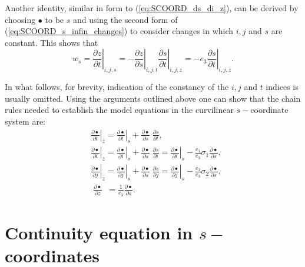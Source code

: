 \documentclass[../main/NEMO_manual]{subfiles}
\begin{document}
Another identity, similar in form to (\autoref{eq:SCOORD_ds_di_z}), can be derived
by choosing $\bullet$ to be $s$ and using the second form of (\autoref{eq:SCOORD_s_infin_changes}) to consider
changes in which $i , j$ and $s$ are constant. This shows that
\begin{equation}
\label{eq:SCOORD_w_in_s}
w_s = \left. \frac{ \partial z }{\partial t} \right|_{i,j,s} =
- \left. \frac{ \partial z }{\partial s} \right|_{i,j,t}
  \left. \frac{ \partial s }{\partial t} \right|_{i,j,z}
  = - e_3 \left. \frac{ \partial s }{\partial t} \right|_{i,j,z} .
\end{equation}

In what follows, for brevity, indication of the constancy of the $i, j$ and $t$ indices is
usually omitted. Using the arguments outlined above one can show that the chain rules needed to establish
the model equations in the curvilinear $s-$coordinate system are:
\begin{equation}
  \label{eq:SCOORD_s_chain_rule2}
  \begin{aligned}
    &\left. {\frac{\partial \bullet }{\partial t}} \right|_z  =
    \left. {\frac{\partial \bullet }{\partial t}} \right|_s
	 + \frac{\partial \bullet }{\partial s}\; \frac{\partial s}{\partial t} , \\
    &\left. {\frac{\partial \bullet }{\partial i}} \right|_z  =
    \left. {\frac{\partial \bullet }{\partial i}} \right|_s
    +\frac{\partial \bullet }{\partial s}\; \frac{\partial s}{\partial i}=
    \left. {\frac{\partial \bullet }{\partial i}} \right|_s
    -\frac{e_1 }{e_3 }\sigma_1 \frac{\partial \bullet }{\partial s} , \\
    &\left. {\frac{\partial \bullet }{\partial j}} \right|_z  =
    \left. {\frac{\partial \bullet }{\partial j}} \right|_s
    + \frac{\partial \bullet }{\partial s}\;\frac{\partial s}{\partial j}=
    \left. {\frac{\partial \bullet }{\partial j}} \right|_s
    - \frac{e_2 }{e_3 }\sigma_2 \frac{\partial \bullet }{\partial s} , \\
    &\;\frac{\partial \bullet }{\partial z}  \;\; = \frac{1}{e_3 }\frac{\partial \bullet }{\partial s} .
  \end{aligned}
\end{equation}

\section{Continuity equation in $s-$coordinates}
\label{sec:SCOORD_continuity}
\end{document}
